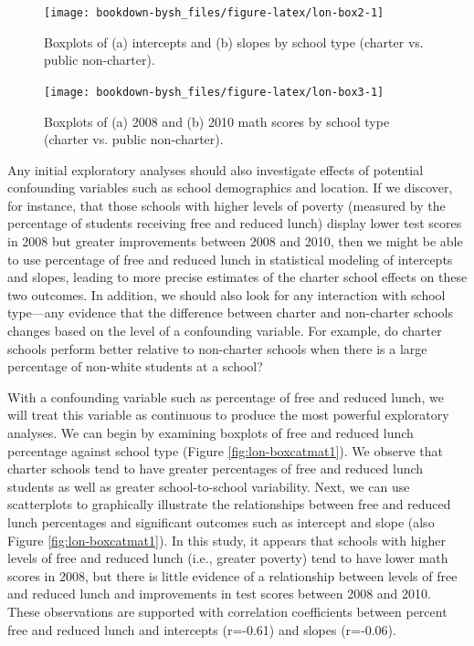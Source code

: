 \documentclass[
]{krantz}
\begin{document}
\begin{figure}

{\centering \texttt{[image: bookdown-bysh\_files/figure-latex/lon-box2-1]} 

}

\caption{Boxplots of (a) intercepts and (b) slopes by school type (charter vs. public non-charter).}\label{fig:lon-box2}
\end{figure}

\begin{figure}

{\centering \texttt{[image: bookdown-bysh\_files/figure-latex/lon-box3-1]} 

}

\caption{Boxplots of (a) 2008 and (b) 2010 math scores by school type (charter vs. public non-charter).}\label{fig:lon-box3}
\end{figure}

Any initial exploratory analyses should also investigate effects of potential confounding variables such as school demographics and location. If we discover, for instance, that those schools with higher levels of poverty (measured by the percentage of students receiving free and reduced lunch) display lower test scores in 2008 but greater improvements between 2008 and 2010, then we might be able to use percentage of free and reduced lunch in statistical modeling of intercepts and slopes, leading to more precise estimates of the charter school effects on these two outcomes. In addition, we should also look for any interaction with school type---any evidence that the difference between charter and non-charter schools changes based on the level of a confounding variable. For example, do charter schools perform better relative to non-charter schools when there is a large percentage of non-white students at a school?

With a confounding variable such as percentage of free and reduced lunch, we will treat this variable as continuous to produce the most powerful exploratory analyses. We can begin by examining boxplots of free and reduced lunch percentage against school type (Figure \ref{fig:lon-boxcatmat1}). We observe that charter schools tend to have greater percentages of free and reduced lunch students as well as greater school-to-school variability. Next, we can use scatterplots to graphically illustrate the relationships between free and reduced lunch percentages and significant outcomes such as intercept and slope (also Figure \ref{fig:lon-boxcatmat1}). In this study, it appears that schools with higher levels of free and reduced lunch (i.e., greater poverty) tend to have lower math scores in 2008, but there is little evidence of a relationship between levels of free and reduced lunch and improvements in test scores between 2008 and 2010. These observations are supported with correlation coefficients between percent free and reduced lunch and intercepts (r=-0.61) and slopes (r=-0.06).
\end{document}
